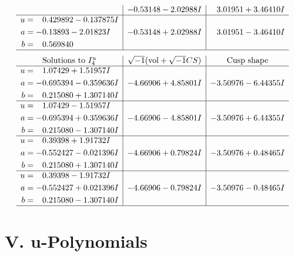\documentclass[1p]{elsarticle_modified}
\theoremstyle{definition}
\newcommand{\I}{\sqrt{-1}}
\begin{document}
$$\begin{array}{c|c|c}
 & -0.53148 - 2.02988 I & \phantom{-}3.01951 + 3.46410 I \\ \hline\begin{aligned}
u &= \phantom{-}0.429892 - 0.137875 I \\
a &= -0.13893 - 2.01823 I \\
b &= \phantom{-}0.569840\phantom{ +0.000000I}\end{aligned}
 & -0.53148 + 2.02988 I & \phantom{-}3.01951 - 3.46410 I\\
 \hline 
 \end{array}$$\newpage$$\begin{array}{c|c|c}  
\text{Solutions to }I^u_{4}& \I (\text{vol} + \sqrt{-1}CS) & \text{Cusp shape}\\
 \hline 
\begin{aligned}
u &= \phantom{-}1.07429 + 1.51957 I \\
a &= -0.695394 - 0.359636 I \\
b &= \phantom{-}0.215080 + 1.307140 I\end{aligned}
 & -4.66906 + 4.85801 I & -3.50976 - 6.44355 I \\ \hline\begin{aligned}
u &= \phantom{-}1.07429 - 1.51957 I \\
a &= -0.695394 + 0.359636 I \\
b &= \phantom{-}0.215080 - 1.307140 I\end{aligned}
 & -4.66906 - 4.85801 I & -3.50976 + 6.44355 I \\ \hline\begin{aligned}
u &= \phantom{-}0.39398 + 1.91732 I \\
a &= -0.552427 - 0.021396 I \\
b &= \phantom{-}0.215080 + 1.307140 I\end{aligned}
 & -4.66906 + 0.79824 I & -3.50976 + 0.48465 I \\ \hline\begin{aligned}
u &= \phantom{-}0.39398 - 1.91732 I \\
a &= -0.552427 + 0.021396 I \\
b &= \phantom{-}0.215080 - 1.307140 I\end{aligned}
 & -4.66906 - 0.79824 I & -3.50976 - 0.48465 I\\
 \hline 
 \end{array}$$\newpage
\newpage\renewcommand{\arraystretch}{1}
\centering \section*{ V. u-Polynomials}
\end{document}
